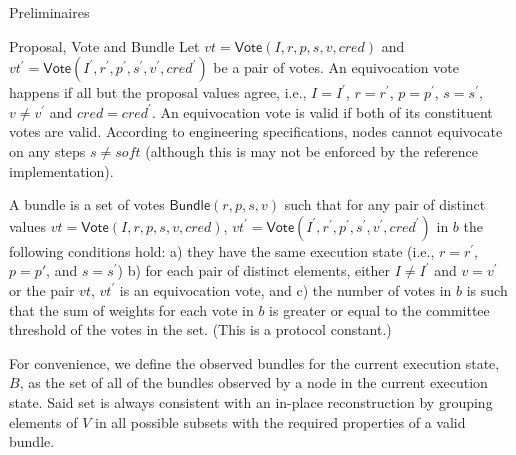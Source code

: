 \documentclass[10pt,a4paper]{article}
\begin{document}
\begin{section}{Preliminaires}
\begin{subsection}{Proposal, Vote and Bundle}
Let 
  $vt=\mathsf{Vote}(I, r, p, s, v, cred)$ and 
  $vt^\prime=\mathsf{Vote}(I^\prime, r^\prime, p^\prime, s^\prime, v^\prime, cred^\prime)$ be a pair of votes.
An {\sf equivocation vote} happens 
if all but the proposal values agree, i.e., $I=I^\prime$, $r=r^\prime$, $p=p^\prime$,
$s=s^\prime$, $v\neq v^\prime$ and $cred=cred^\prime$.
An equivocation vote is valid if both of its constituent votes are valid.
According to engineering specifications, nodes cannot equivocate on any steps $s \neq soft$
(although this is may not be enforced by the reference implementation).

A {\sf bundle} is a set of votes $\mathsf{Bundle}(r,p,s,v)$ such that for any pair of distinct values 
$vt=\mathsf{Vote}(I, r, p, s, v, cred)$,
$vt^\prime=\mathsf{Vote}(I^\prime, r^\prime, p^\prime, s^\prime, v^\prime, cred^\prime)$ in $b$ 
the following conditions hold: 
a) they have the same execution state (i.e., $r = r^\prime$, $p=p\prime$,
and $s=s^\prime$)
b) for each pair of distinct elements, either $I\neq I^\prime$ and $v=v^\prime$ 
  or the pair $vt$, $vt^\prime$ is an equivocation vote, and
c) the number of votes in $b$ is such that the sum of weights for each vote in $b$ is greater or equal to the
committee threshold of the votes in the set. (This is a protocol constant.)

For convenience, we define the {\sf observed bundles} for the current execution state, 
$B$, as the set of all of the bundles observed by a node in the current execution state. 
Said set is always consistent with an in-place reconstruction by grouping elements of $V$ in all 
possible subsets with the required properties of a valid bundle.
\end{subsection}

\end{section}
\end{document}

